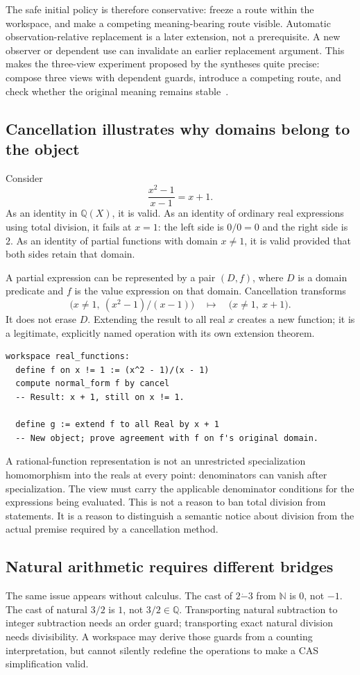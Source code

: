 \documentclass[11pt,letterpaper]{article}
\newcommand{\N}{\mathbb N}
\newcommand{\Q}{\mathbb Q}
\theoremstyle{definition}
\theoremstyle{remark}
\begin{document}
The safe initial policy is therefore conservative: freeze a route within the
workspace, and make a competing meaning-bearing route visible. Automatic
observation-relative replacement is a later extension, not a prerequisite.
A new observer or dependent use can invalidate an earlier replacement argument.
This makes the three-view experiment proposed by the syntheses quite precise:
compose three views with dependent guards, introduce a competing route, and
check whether the original meaning remains stable~\cite{synthesis}.

\subsection{Cancellation illustrates why domains belong to the object}
Consider
\[
 \frac{x^2-1}{x-1}=x+1.
\]
As an identity in $\Q(X)$, it is valid. As an identity of ordinary real expressions
using total division, it fails at $x=1$: the left side is $0/0=0$ and the right
side is $2$. As an identity of partial functions with domain $x\neq1$, it is valid
provided that both sides retain that domain.

A partial expression can be represented by a pair $(D,f)$, where $D$ is a domain
predicate and $f$ is the value expression on that domain. Cancellation transforms
\[
 \bigl(x\neq1,\ (x^2-1)/(x-1)\bigr)
 \quad\longmapsto\quad
 \bigl(x\neq1,\ x+1\bigr).
\]
It does not erase $D$. Extending the result to all real $x$ creates a new function;
it is a legitimate, explicitly named operation with its own extension theorem.

\begin{lstlisting}
workspace real_functions:
  define f on x != 1 := (x^2 - 1)/(x - 1)
  compute normal_form f by cancel
  -- Result: x + 1, still on x != 1.

  define g := extend f to all Real by x + 1
  -- New object; prove agreement with f on f's original domain.
\end{lstlisting}

A rational-function representation is not an unrestricted specialization
homomorphism into the reals at every point: denominators can vanish after
specialization. The view must carry the applicable denominator conditions for
the expressions being evaluated. This is not a reason to ban total division
from statements. It is a reason to distinguish a semantic notice about division
from the actual premise required by a cancellation method.

\subsection{Natural arithmetic requires different bridges}
The same issue appears without calculus. The cast of $2\mathbin{\dot{-}}3$
from $\N$ is $0$, not $-1$. The cast of natural $3/2$ is $1$, not $3/2\in\Q$.
Transporting natural subtraction to integer subtraction needs an order guard;
transporting exact natural division needs divisibility. A workspace may derive
those guards from a counting interpretation, but cannot silently redefine the
operations to make a CAS simplification valid.
\end{document}
